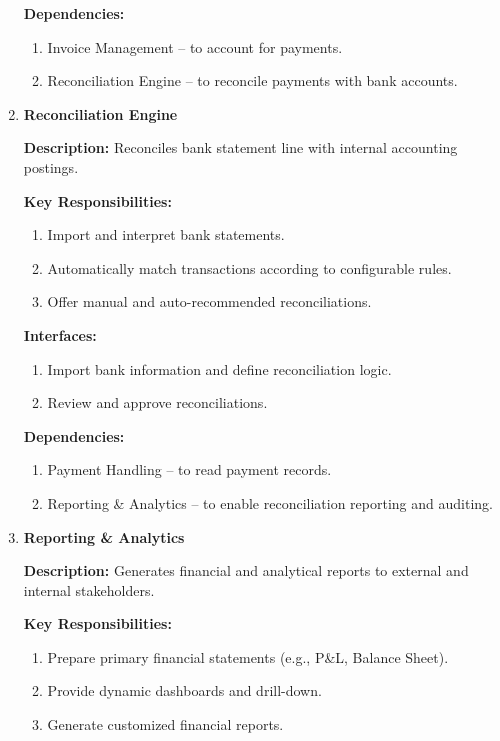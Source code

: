 \documentclass[11pt,a4paper]{article}
\begin{document}
\begin{enumerate}
    \textbf{Dependencies:}
    \begin{enumerate}
        \item Invoice Management – to account for payments.
        \item Reconciliation Engine – to reconcile payments with bank accounts.
    \end{enumerate}

    \item \textbf{Reconciliation Engine}
        
    \textbf{Description:} Reconciles bank statement line with internal accounting postings.
    \medskip

    \textbf{Key Responsibilities:}
    \begin{enumerate}
        \item Import and interpret bank statements.
        \item Automatically match transactions according to configurable rules.
        \item Offer manual and auto-recommended reconciliations.
    \end{enumerate}

    \textbf{Interfaces:}
    \begin{enumerate}
        \item Import bank information and define reconciliation logic.
        \item Review and approve reconciliations.
    \end{enumerate}

    \textbf{Dependencies:}
    \begin{enumerate}
        \item Payment Handling – to read payment records.
        \item Reporting \& Analytics – to enable reconciliation reporting and auditing.
    \end{enumerate}

    \item \textbf{Reporting \& Analytics}
            
    \textbf{Description:} Generates financial and analytical reports to external and internal stakeholders.
    \medskip

    \textbf{Key Responsibilities:}
    \begin{enumerate}
        \item Prepare primary financial statements (e.g., P\&L, Balance Sheet).
        \item Provide dynamic dashboards and drill-down.
        \item Generate customized financial reports.
    \end{enumerate}


\end{enumerate}
\end{document}
